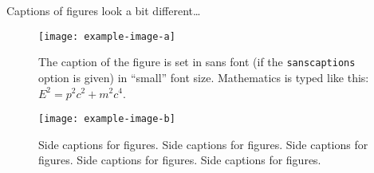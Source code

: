 \documentclass{article}
\def\separator{\vskip\baselineskip\hrule\vskip\baselineskip}
\begin{document}
Captions of figures look a bit different\ldots
\begin{figure}
  \begin{center}
    \texttt{[image: example-image-a]}
  \end{center}
  \caption{The caption of the figure is set in sans font (if the \texttt{sanscaptions} option is given) in ``small'' font size.  Mathematics is typed like this: $E^2=p^2c^2 + m^2c^4$.}
\end{figure}

\begin{SCfigure}
  \texttt{[image: example-image-b]}
  \caption{Side captions for figures.
Side captions for figures.
Side captions for figures.
Side captions for figures.
Side captions for figures.}
\end{SCfigure}












\end{document}
